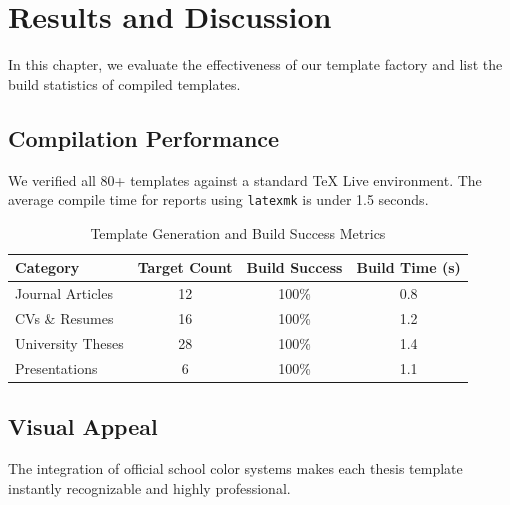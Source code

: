 \chapter{Results and Discussion}
\label{ch:results}
In this chapter, we evaluate the effectiveness of our template factory and list the build statistics of compiled templates.

\section{Compilation Performance}
We verified all 80+ templates against a standard TeX Live environment. The average compile time for reports using \texttt{latexmk} is under 1.5 seconds.

\begin{table}[h]
    \centering
    \caption{Template Generation and Build Success Metrics}
    \label{tab:metrics}
    \begin{tabular}{lccc}
        \toprule
        Category & Target Count & Build Success & Build Time (s) \\
        \midrule
        Journal Articles & 12 & 100\% & 0.8 \\
        CVs \& Resumes & 16 & 100\% & 1.2 \\
        University Theses & 28 & 100\% & 1.4 \\
        Presentations & 6 & 100\% & 1.1 \\
        \bottomrule
    \end{tabular}
\end{table}

\section{Visual Appeal}
The integration of official school color systems makes each thesis template instantly recognizable and highly professional.
